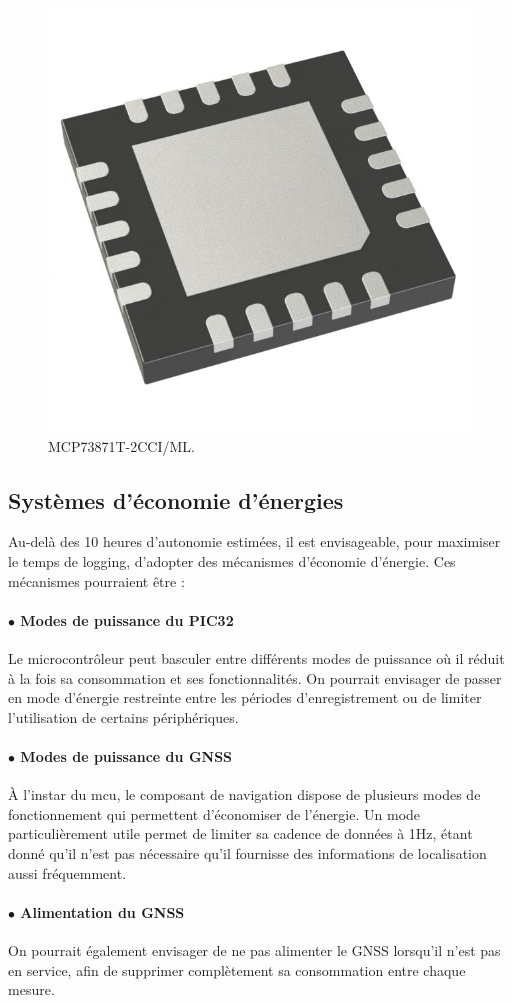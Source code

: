 \begin{figure}[h]
	\centering
	\includegraphics[width=0.2\linewidth]{../figures/pre_etude/MCP}
	\caption{MCP73871T-2CCI/ML.}
	\label{fig:mcp}
\end{figure}

\clearpage

\subsection{Systèmes d'économie d'énergies} 

Au-delà des 10 heures d'autonomie estimées, il est envisageable, pour maximiser le temps de logging, d'adopter des mécanismes d'économie d'énergie. Ces mécanismes pourraient être :

\paragraph*{$\bullet$ Modes de puissance du PIC32} Le microcontrôleur peut basculer entre différents modes de puissance où il réduit à la fois sa consommation et ses fonctionnalités. On pourrait envisager de passer en mode d'énergie restreinte entre les périodes d'enregistrement ou de limiter l'utilisation de certains périphériques.

\paragraph*{$\bullet$ Modes de puissance du \gls{GNSS}} À l'instar du \gls{mcu}, le composant de navigation dispose de plusieurs modes de fonctionnement qui permettent d'économiser de l'énergie. Un mode particulièrement utile permet de limiter sa cadence de données à 1Hz, étant donné qu'il n'est pas nécessaire qu'il fournisse des informations de localisation aussi fréquemment.

\paragraph*{$\bullet$ Alimentation du \gls{GNSS}} On pourrait également envisager de ne pas alimenter le \gls{GNSS} lorsqu'il n'est pas en service, afin de supprimer complètement sa consommation entre chaque mesure.

